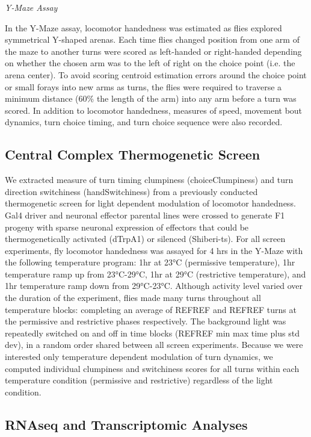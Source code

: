 \documentclass[12pt,letterpaper]{article}
\begin{document}
\textit{Y-Maze Assay}

In the Y-Maze assay, locomotor handedness was estimated as flies explored symmetrical Y-shaped arenas. Each time flies changed position from one arm of the maze to another turns were scored as left-handed or right-handed depending on whether the chosen arm was to the left of right on the choice point (i.e. the arena center). To avoid scoring centroid estimation errors around the choice point or small forays into new arms as turns, the flies were required to traverse a minimum distance (60\% the length of the arm) into any arm before a turn was scored. In addition to locomotor handedness, measures of speed, movement bout dynamics,  turn choice timing, and turn choice sequence were also recorded.

\subsection{Central Complex Thermogenetic Screen}

We extracted measure of turn timing clumpiness (choiceClumpiness) and turn direction switchiness (handSwitchiness) from a previously conducted thermogenetic screen for light dependent modulation of locomotor handedness. Gal4 driver and neuronal effector parental lines were crossed to generate F1 progeny with sparse neuronal expression of effectors that could be thermogenetically activated (dTrpA1) or silenced (Shiberi-ts). For all screen experiments, fly locomotor handedness was assayed for 4 hrs in the Y-Maze with the following temperature program: 1hr at 23°C (permissive temperature), 1hr temperature ramp up from 23°C-29°C, 1hr at 29°C (restrictive temperature), and 1hr temperature ramp down from 29°C-23°C. Although activity level varied over the duration of the experiment, flies made many turns throughout all temperature blocks: completing an average of REFREF and REFREF turns at the permissive and restrictive phases respectively. The background light was repeatedly switched on and off in time blocks (REFREF min max time plus std dev), in a random order shared between all screen experiments. Because we were interested only temperature dependent modulation of turn dynamics, we computed individual clumpiness and switchiness scores for all turns within each temperature condition (permissive and restrictive) regardless of the light condition.

\subsection{RNAseq and Transcriptomic Analyses}
\end{document}
